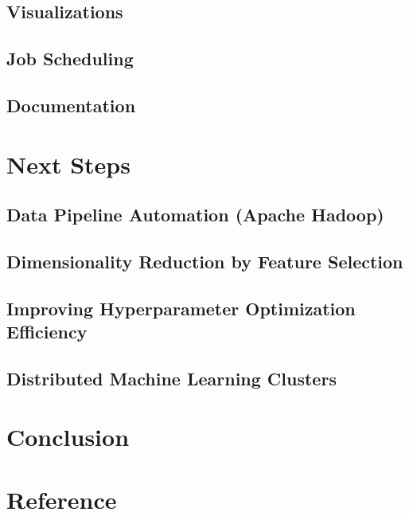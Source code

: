 \documentclass[11pt, oneside]{article}
\begin{document}
\subsection{Visualizations}
\subsection{Job Scheduling}
\subsection{Documentation}

\section{Next Steps}
\subsection{Data Pipeline Automation (Apache Hadoop)}
\subsection{Dimensionality Reduction by Feature Selection}
\subsection{Improving Hyperparameter Optimization Efficiency}
\subsection{Distributed Machine Learning Clusters}

\section{Conclusion}

\section{Reference}



\end{document}

